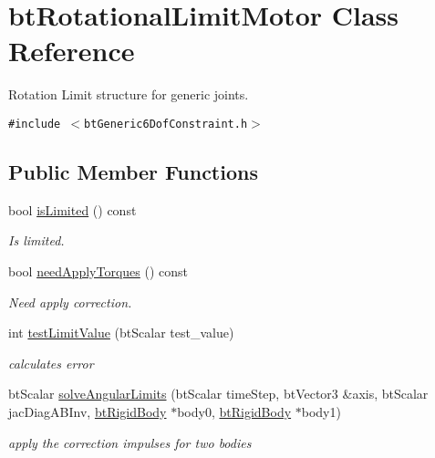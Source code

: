 \hypertarget{classbt_rotational_limit_motor}{
\section{btRotationalLimitMotor Class Reference}
\label{classbt_rotational_limit_motor}
}
Rotation Limit structure for generic joints.  


{\tt \#include $<$btGeneric6DofConstraint.h$>$}

\subsection*{Public Member Functions}
\begin{CompactItemize}
\item 
\hypertarget{classbt_rotational_limit_motor_ada1455f0a50d55d44619dd9f215a119}{
bool \hyperlink{classbt_rotational_limit_motor_ada1455f0a50d55d44619dd9f215a119}{isLimited} () const }
\label{classbt_rotational_limit_motor_ada1455f0a50d55d44619dd9f215a119}

\begin{CompactList}\small\item\em Is limited. \item\end{CompactList}\item 
\hypertarget{classbt_rotational_limit_motor_5ab6c5d80964fb373b30c25a2d0efb4a}{
bool \hyperlink{classbt_rotational_limit_motor_5ab6c5d80964fb373b30c25a2d0efb4a}{needApplyTorques} () const }
\label{classbt_rotational_limit_motor_5ab6c5d80964fb373b30c25a2d0efb4a}

\begin{CompactList}\small\item\em Need apply correction. \item\end{CompactList}\item 
int \hyperlink{classbt_rotational_limit_motor_c0651bd36beda2dbb23c45a90dc1cccd}{testLimitValue} (btScalar test\_\-value)
\begin{CompactList}\small\item\em calculates error \item\end{CompactList}\item 
btScalar \hyperlink{classbt_rotational_limit_motor_d52e9b1c402c7bdd47fb1a9de28afb7e}{solveAngularLimits} (btScalar timeStep, btVector3 \&axis, btScalar jacDiagABInv, \hyperlink{classbt_rigid_body}{btRigidBody} $\ast$body0, \hyperlink{classbt_rigid_body}{btRigidBody} $\ast$body1)
\begin{CompactList}\small\item\em apply the correction impulses for two bodies \item\end{CompactList}\end{CompactItemize}
